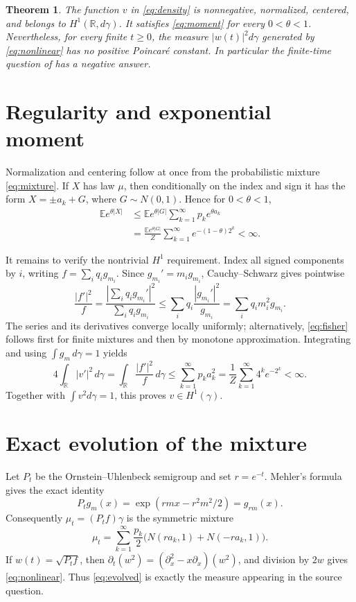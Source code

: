 \documentclass[10pt]{article}
\newtheorem{theorem}{Theorem}
\newcommand{\R}{\mathbb R}
\begin{document}
\begin{theorem}\label{thm:main}
The function $v$ in \eqref{eq:density} is nonnegative, normalized, centered,
and belongs to $H^1(\R,d\gamma)$.  It satisfies \eqref{eq:moment} for every
$0<\theta<1$.  Nevertheless, for every finite $t\ge0$, the measure
$|w(t)|^2d\gamma$ generated by \eqref{eq:nonlinear} has no positive
Poincar\'e constant.  In particular the finite-time question of \cite{BDS}
has a negative answer.
\end{theorem}

\section{Regularity and exponential moment}
Normalization and centering follow at once from the probabilistic mixture
\eqref{eq:mixture}.  If $X$ has law $\mu$, then conditionally on the index and
sign it has the form $X=\pm a_k+G$, where $G\sim N(0,1)$.  Hence for
$0<\theta<1$,
\begin{align*}
 \mathbb E e^{\theta|X|}
 &\le \mathbb E e^{\theta|G|}\sum_{k=1}^{\infty}p_ke^{\theta a_k}\\
 &=\frac{\mathbb E e^{\theta|G|}}{Z}
   \sum_{k=1}^{\infty}e^{-(1-\theta)2^k}<\infty.
\end{align*}

It remains to verify the nontrivial $H^1$ requirement.  Index all signed
components by $i$, writing $f=\sum_iq_i g_{m_i}$.  Since
$g_{m_i}'=m_i g_{m_i}$, Cauchy--Schwarz gives pointwise
\begin{equation}\label{eq:fisher}
 \frac{|f'|^2}{f}
 =\frac{|\sum_iq_i g_{m_i}'|^2}{\sum_iq_i g_{m_i}}
 \le \sum_iq_i\frac{|g_{m_i}'|^2}{g_{m_i}}
 =\sum_iq_i m_i^2g_{m_i}.
\end{equation}
The series and its derivatives converge locally uniformly; alternatively,
\eqref{eq:fisher} follows first for finite mixtures and then by monotone
approximation.  Integrating and using $\int g_m\,d\gamma=1$ yields
\[
 4\int_{\R}|v'|^2\,d\gamma
 =\int_{\R}\frac{|f'|^2}{f}\,d\gamma
 \le\sum_{k=1}^{\infty}p_ka_k^2
 =\frac1Z\sum_{k=1}^{\infty}4^ke^{-2^k}<\infty.
\]
Together with $\int v^2d\gamma=1$, this proves $v\in H^1(\gamma)$.

\section{Exact evolution of the mixture}
Let $P_t$ be the Ornstein--Uhlenbeck semigroup and set $r=e^{-t}$.  Mehler's
formula gives the exact identity
\begin{equation}\label{eq:mehler}
 P_tg_m(x)=\exp(rmx-r^2m^2/2)=g_{rm}(x).
\end{equation}
Consequently $\mu_t=(P_tf)\gamma$ is the symmetric mixture
\begin{equation}\label{eq:evolved}
 \mu_t=\sum_{k=1}^{\infty}\frac{p_k}{2}
       \bigl(N(ra_k,1)+N(-ra_k,1)\bigr).
\end{equation}
If $w(t)=\sqrt{P_tf}$, then
$\partial_t(w^2)= (\partial_x^2-x\partial_x)(w^2)$, and division by $2w$
gives \eqref{eq:nonlinear}.  Thus \eqref{eq:evolved} is exactly the measure
appearing in the source question.
\end{document}
